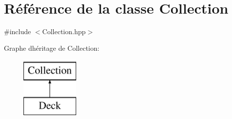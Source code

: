 \hypertarget{classCollection}{}\section{Référence de la classe Collection}
\label{classCollection}


{\ttfamily \#include $<$Collection.\+hpp$>$}

Graphe d\textquotesingle{}héritage de Collection\+:\begin{figure}[H]
\begin{center}
\leavevmode
\includegraphics[height=3.000000cm]{classCollection}
\end{center}
\end{figure}
